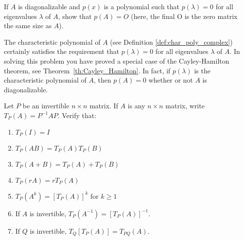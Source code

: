 \documentclass{ximera}
\begin{document}
\begin{problem}\label{prb:diagonalizable_poly}
If $A$ is diagonalizable and $p(x)$ is a polynomial such that $p(\lambda) = 0$ for all eigenvalues $\lambda$ of $A$, show that $p(A) = O$ (here, the final O is the zero matrix the same size as $A$).

\begin{remark}
The characteristic polynomial of $A$ (see Definition \ref{def:char_poly_complex}) certainly satisfies the requirement that $p(\lambda) = 0$ for all eigenvalues $\lambda$ of $A$.  In solving this problem you have proved a special case of the Cayley-Hamilton theorem, see Theorem~\ref{th:Cayley_Hamilton}.  In fact, if $p(\lambda)$ is the characteristic polynomial of $A$, then $p(A) = 0$ whether or not $A$ is diagonalizable.
\end{remark}
\end{problem}

\begin{problem}\label{prob:5_5_12}
Let $P$ be an invertible $n \times n$ matrix. If $A$ is any $n \times n$ matrix, write $T_{P}(A) = P^{-1}AP$. Verify that:

\begin{enumerate}
\item\label{prob:5_5_12a} $T_{P}(I) = I$
\item\label{prob:5_5_12b} $T_{P}(AB) = T_{P}(A)T_{P}(B)$
\item\label{prob:5_5_12c} $T_{P}(A + B) = T_{P}(A) + T_{P}(B)$
\item\label{prob:5_5_12d} $T_{P}(rA) = rT_{P}(A)$
\item\label{prob:5_5_12e} $T_{P}(A^{k}) = [T_{P}(A)]^{k}$ for $k \geq 1$
\item\label{prob:5_5_12f} If $A$ is invertible, $T_{P}(A^{-1}) = [T_{P}(A)]^{-1}$.
\item\label{prob:5_5_12g} If $Q$ is invertible, $T_{Q}[T_{P}(A)] = T_{PQ}(A)$.
\end{enumerate}

\end{problem}
\end{document}
